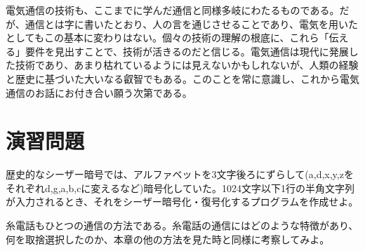 電気通信の技術も、ここまでに学んだ通信と同様多岐にわたるものである。だが、通信とは字に書いたとおり、人の言を通じさせることであり、電気を用いたとしてもこの基本に変わりはない。個々の技術の理解の根底に、これら「伝える」要件を見出すことで、技術が活きるのだと信じる。電気通信は現代に発展した技術であり、あまり枯れているようには見えないかもしれないが、人類の経験と歴史に基づいた大いなる叡智でもある。このことを常に意識し、これから電気通信のお話にお付き合い願う次第である。

\section*{演習問題}
\begin{problems}
\item 歴史的なシーザー暗号では、アルファベットを3文字後ろにずらして(a,d,x,y,zをそれぞれd,g,a,b,cに変えるなど)暗号化していた。1024文字以下1行の半角文字列が入力されるとき、それをシーザー暗号化・復号化するプログラムを作成せよ。

\item 糸電話もひとつの通信の方法である。糸電話の通信にはどのような特徴があり、何を取捨選択したのか、本章の他の方法を見た時と同様に考察してみよ。
\end{problems}
